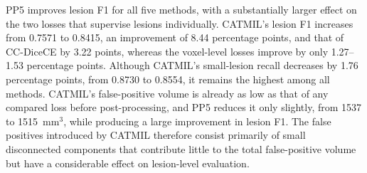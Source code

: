 \begin{table}[t]
\centering
\caption{Comparison of CATMIL with standard losses and the instance-level
loss CC-DiceCE on the MSLesSeg test set after post-processing with a
minimum connected-component size of 5 voxels (PP5). Best values are shown
in \textbf{bold}; second-best values are \underline{underlined}.}
\label{tab:loss_comparison_small_lesion_pp5}
\end{table}

PP5 improves lesion F1 for all five methods, with a substantially larger
effect on the two losses that supervise lesions individually. CATMIL's
lesion F1 increases from 0.7571 to 0.8415, an improvement of 8.44
percentage points, and that of CC-DiceCE by 3.22 points, whereas the
voxel-level losses improve by only 1.27--1.53 percentage points. Although
CATMIL's small-lesion recall decreases by 1.76 percentage points, from
0.8730 to 0.8554, it remains the highest among all methods. CATMIL's
false-positive volume is already as low as that of any compared loss
before post-processing, and PP5 reduces it only slightly, from 1537
to 1515~mm$^3$, while producing a large improvement in lesion F1. The false
positives introduced by CATMIL therefore consist primarily of small
disconnected components that contribute little to the total false-positive
volume but have a considerable effect on lesion-level evaluation.

